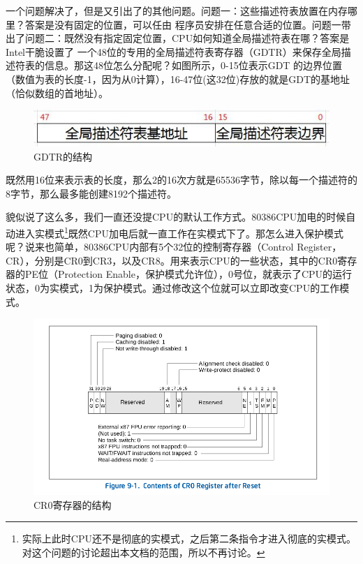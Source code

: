  \par 一个问题解决了，但是又引出了的其他问题。问题一：这些描述符表放置在内存哪里？答案是没有固定的位置，可以任由 程序员安排在任意合适的位置。问题一带出了问题二：既然没有指定固定位置，CPU如何知道全局描述符表在哪？答案是Intel干脆设置了 一个48位的专用的全局描述符表寄存器（GDTR）来保存全局描述符表的信息。那这48位怎么分配呢？如图所示，0-15位表示GDT 的边界位置（数值为表的长度-1，因为从0计算），16-47位(这32位)存放的就是GDT的基地址（恰似数组的首地址）。

\begin{figure}[ht]
      \centering
      \includegraphics[scale=0.5]{picture/chapt6/gdtr.png}
      \caption{GDTR的结构}
\end{figure}

\par 既然用16位来表示表的长度，那么2的16次方就是65536字节，除以每一个描述符的8字节，那么最多能创建8192个描述符。

\par 貌似说了这么多，我们一直还没提CPU的默认工作方式。80386CPU加电的时候自动进入实模式\footnote{实际上此时CPU还不是彻底的实模式，之后第二条指令才进入彻底的实模式。对这个问题的讨论超出本文档的范围，所以不再讨论。}既然CPU加电后就一直工作在实模式下了。那怎么进入保护模式呢？说来也简单，80386CPU内部有5个32位的控制寄存器（Control Register，CR），分别是CR0到CR3，以及CR8。用来表示CPU的一些状态，其中的CR0寄存器的PE位（Protection Enable，保护模式允许位），0号位，就表示了CPU的运行状态，0为实模式，1为保护模式。通过修改这个位就可以立即改变CPU的工作模式。

\begin{figure}[ht]
      \centering
      \includegraphics[scale=0.5]{picture/chapt6/cr0.png}
      \caption{CR0寄存器的结构}
\end{figure}


